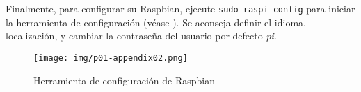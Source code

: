 \documentclass[letterpaper,10.5pt]{article}
\begin{document}
Finalmente, para configurar su Raspbian, ejecute \texttt{sudo raspi-config}  para iniciar la herramienta de configuración (véase ).
Se aconseja definir el idioma, localización, y cambiar la contraseña del usuario por defecto \textit{pi}.

\begin{figure}[H]
	\centering%
	\texttt{[image: img/p01-appendix02.png]} %
	\caption{Herramienta de configuración de Raspbian}
	\label{fig:raspberry-config-tool} %
\end{figure}
\end{document}
